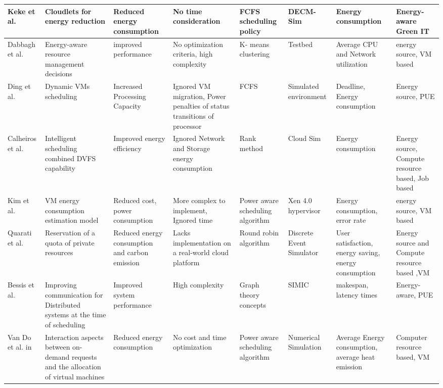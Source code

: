 \begin{table*}[!htbp]
{\begin{tabular}{|p{1.5cm} p{2cm} p{2cm} p{2cm} p{2cm} p{2cm} p{2cm} p{2cm}|}
Keke et al.~\cite{gai2016dynamic} & Cloudlets for energy reduction & Reduced energy consumption & No time consideration & FCFS scheduling policy & DECM-Sim & Energy consumption & Energy-aware Green IT
\\ \hline

 

Dabbagh et al.~\cite{dabbagh2015energy} &  Energy-aware resource management decisions  & improved performance & No optimization criteria, high complexity& K- means clustering& Testbed & Average CPU and Network utilization & energy source, VM based
\\ \hline

Ding  et al.~\cite{ding2015energy} & Dynamic VMs scheduling & Increased Processing Capacity & Ignored VM migration, Power penalties of status transitions of processor & FCFS & Simulated environment  & Deadline, Energy consumption & Energy source, PUE
\\ \hline 

Calheiros et al.~\cite{calheiros2014energy} & Intelligent scheduling combined DVFS capability  &  Improved energy efficiency  & Ignored Network and Storage energy consumption  &  Rank method   & Cloud Sim & Energy consumption & Energy source, Compute resource based, Job based
\\ \hline 

Kim et al.~\cite{kim2014energy} & VM energy consumption estimation model & Reduced cost, power consumption & More complex to implement, Ignored time & Power aware scheduling algorithm & Xen 4.0 hypervisor & Energy consumption, error rate & energy source, VM based
\\ \hline

Quarati et al.~\cite{quarati2013hybrid} &  Reservation of a quota of private resources & Reduced energy consumption and carbon emission & Lacks implementation on a real-world cloud platform & Round robin algorithm & Discrete Event Simulator & User satisfaction, energy saving, energy consumption & Energy source and  Compute resource based ,VM 
\\ \hline

Bessis et al.~\cite{bessis2013using} & Improving communication for Distributed systems at the time of scheduling & Improved system performance & High complexity & Graph theory concepts & SIMIC & makespan, latency times & Energy-aware, PUE
\\ \hline 

Van Do et al. in~\cite{van2012comparison} & Interaction aspects between on-demand requests and the allocation of virtual machines & Reduced energy consumption & No cost and time optimization & Power aware scheduling algorithm & Numerical Simulation & Average Energy consumption, average heat emission & Computer resource based, VM
\\ \hline


\end{tabular}}
\end{table*}
